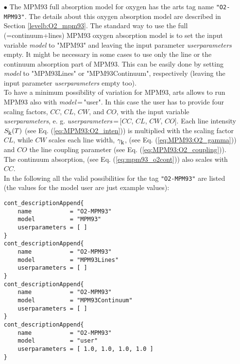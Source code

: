 \begin{itemize}
\item[$\bullet$] The MPM93 full absorption model for oxygen \citep{liebeetal:93}
     has the arts tag name {\tt "O2-MPM93"}. The details about this 
     oxygen absorption model are described in Section \ref{levelb:O2_mpm93}. 
     The standard way to use the full (=continuum+lines) MPM93 oxygen 
     absorption model is to set the input variable {\it model} 
     to "MPM93" and leaving the input parameter {\it userparameters} empty. 
     It might be necessary in some cases to use only the line or the 
     continuum absorption part of MPM93. This can be easily done 
     by setting {\it model} to "MPM93Lines" or "MPM93Continuum", 
     respectively (leaving the input parameter {\it userparameters} 
     empty too).\\ To have a minimum possibility of variation for MPM93, 
     arts allows to run MPM93 also with {\it model}\,=\,"user". 
     In this case the user has to provide four scaling factors,  
     $CC$, $CL$, $CW$, and $CO$, with the input variable {\it userparameters}, 
     e. g. {\it userparameters}\,=\,$[$$CC$, $CL$, $CW$, $CO$$]$. 
     Each line intensity $S_{\mbox{\rm \small k}}(T)$ (see Eq. (\ref{eq:MPM93:O2_inten})) 
     is multiplied with the scaling factor $CL$, while $CW$ scales 
     each line width, $\gamma_{\mbox{\rm \small k}}$, (see Eq. (\ref{eq:MPM93:O2_gamma})) and 
     $CO$ the line coupling parameter (see Eq. (\ref{eq:MPM93:O2_coupling})). 
     The continuum absorption, (see Eq. (\ref{eq:mpm93_o2cont})) 
     also scales with $CC$.\\
     In the following all the valid possibilities for the
     tag {\tt "O2-MPM93"} are listed (the values for the 
     model user are just example values):
\begin{lstlisting}
cont_descriptionAppend{
    name           = "O2-MPM93"
    model          = "MPM93"
    userparameters = [ ]
}
cont_descriptionAppend{
    name           = "O2-MPM93"
    model          = "MPM93Lines"
    userparameters = [ ]
}
cont_descriptionAppend{
    name           = "O2-MPM93"
    model          = "MPM93Continuum"
    userparameters = [ ]
}
cont_descriptionAppend{
    name           = "O2-MPM93"
    model          = "user"
    userparameters = [ 1.0, 1.0, 1.0, 1.0 ]
}
\end{lstlisting}


\end{itemize}
